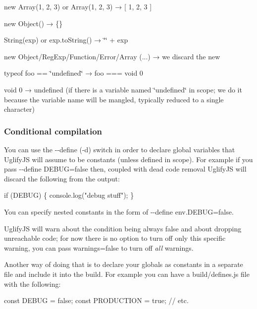 \begin{DoxyItemize}
\item {\ttfamily new Array(1, 2, 3)} or {\ttfamily Array(1, 2, 3)} → {\ttfamily \mbox{[} 1, 2, 3 \mbox{]}}
\item {\ttfamily new Object()} → {\ttfamily \{\}}
\item {\ttfamily String(exp)} or {\ttfamily exp.\+to\+String()} → {\ttfamily \char`\"{}\char`\"{} + exp}
\item {\ttfamily new Object/\+Reg\+Exp/\+Function/\+Error/\+Array (...)} → we discard the {\ttfamily new}
\item {\ttfamily typeof foo == \char`\"{}undefined\char`\"{}} → {\ttfamily foo === void 0}
\item {\ttfamily void 0} → {\ttfamily undefined} (if there is a variable named \char`\"{}undefined\char`\"{} in scope; we do it because the variable name will be mangled, typically reduced to a single character)
\end{DoxyItemize}

\subsubsection*{Conditional compilation}

You can use the {\ttfamily -\/-\/define} ({\ttfamily -\/d}) switch in order to declare global variables that Uglify\+JS will assume to be constants (unless defined in scope). For example if you pass {\ttfamily -\/-\/define D\+E\+B\+UG=false} then, coupled with dead code removal Uglify\+JS will discard the following from the output\+: 
\begin{DoxyCode}
if (DEBUG) \{
    console.log("debug stuff");
\}
\end{DoxyCode}


You can specify nested constants in the form of {\ttfamily -\/-\/define env.\+D\+E\+B\+UG=false}.

Uglify\+JS will warn about the condition being always false and about dropping unreachable code; for now there is no option to turn off only this specific warning, you can pass {\ttfamily warnings=false} to turn off {\itshape all} warnings.

Another way of doing that is to declare your globals as constants in a separate file and include it into the build. For example you can have a {\ttfamily build/defines.\+js} file with the following\+: 
\begin{DoxyCode}
const DEBUG = false;
const PRODUCTION = true;
// etc.
\end{DoxyCode}


